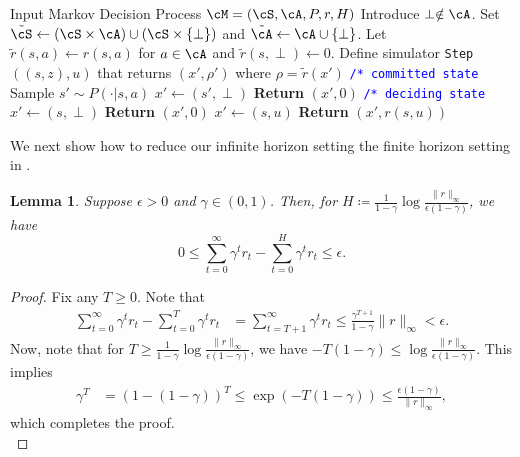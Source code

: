 \documentclass{article}
\theoremstyle{plain}
\newtheorem{lemma}[theorem]{Lemma}
\theoremstyle{definition}
\begin{document}
\begin{algorithm}[hbt!]
    \begin{algorithmic}
 \caption{Reduce State-Action Reward MDP to State-Reward MDP with Deciding States}
        \REQUIRE Input Markov Decision Process $\cM = (\cS, \cA, P, r, H)$
        \STATE Introduce $\perp \notin \cA$.
        \STATE Set $\tilde{\cS} \gets (\cS\times\cA) \cup (\cS\times \{\perp\})$ and $\tilde{\cA} \gets \cA\cup\{\perp\}$. 
        \STATE Let $\tilde{r}(s, a) \gets r(s, a)$ for $a\in \cA$ and $\tilde{r}(s, \perp) \gets 0$. 
        \STATE Define simulator \texttt{Step}$((s,z), u)$ that returns $(x',\rho')$ where $\rho=\tilde{r}(x')$
        \medskip
        \STATE \textcolor{blue}{\texttt{/* committed state}}
        \STATE Sample $s'\sim P(\cdot|s, a)$
        \STATE $x' \gets (s', \perp)$
        \STATE \textbf{Return} $(x', 0)$
        \STATE \textcolor{blue}{\texttt{/*  deciding state}}
        \STATE $x'\gets (s, \perp)$
        \STATE \textbf{Return} $(x', 0)$
        \ELSE
        \STATE $x' \gets (s, u)$
        \STATE \textbf{Return} $(x', r(s, u))$
        \ENDIF
        \ENDIF
    \label{algorithm: reduce state-action reward MDP}
    \end{algorithmic}
\end{algorithm} We next show how to reduce our infinite horizon setting the finite horizon setting in \citet{dann2015sample}.\\

\begin{lemma}\label{truncation lemma}
    Suppose $\epsilon>0$ and $\gamma\in(0,1)$. Then, for $H\coloneqq \frac{1}{1-\gamma}\log \frac{\|r\|_\infty}{\epsilon(1-\gamma)}$, we have 
    \[0\leq \sum_{t=0}^\infty \gamma^t r_t - \sum_{t=0}^H \gamma^t r_t \leq \epsilon.\]
\end{lemma}
\begin{proof}
    Fix any $T\geq 0$. Note that
    \begin{align*}
        \sum_{t=0}^\infty \gamma^t r_t - \sum_{t=0}^T \gamma^t r_t &= \sum_{t=T+1}^\infty \gamma^t r_t \leq \frac{\gamma^{T+1}}{1-\gamma}\|r\|_\infty < \epsilon.
    \end{align*}
    Now, note that for $T\geq \frac{1}{1-\gamma}\log \frac{\|r\|_\infty}{\epsilon(1-\gamma)}$, we have
    $-T(1-\gamma)\leq \log \frac{\|r\|_\infty}{\epsilon(1-\gamma)}$. This implies
    \begin{align*}\gamma^T &= (1-(1-\gamma))^T \leq \exp(-T(1-\gamma)) \leq \frac{\epsilon(1-\gamma)}{\|r\|_\infty},
    \end{align*}
    which completes the proof.\qedhere\\
\end{proof}
\end{document}
